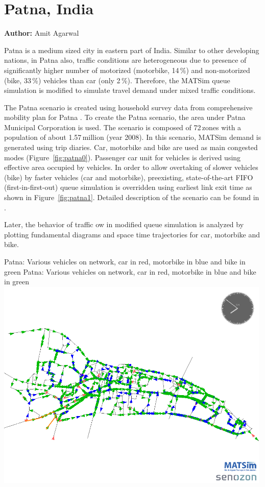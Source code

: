 \section{Patna, India}
\label{sec:patna}
\hfill \textbf{Author:} Amit Agarwal

Patna is a medium sized city in eastern part of India. Similar to other developing nations, in Patna also, traffic conditions are heterogeneous due to presence of significantly higher number of motorized (motorbike, 14\,\%) and non-motorized (bike, 33\,\%) vehicles than car (only 2\,\%). Therefore, the MATSim queue simulation is modified to simulate travel demand under mixed traffic conditions.

The Patna scenario is created using household survey data from comprehensive mobility plan for Patna \citep[][]{TrippItransVks2009PatnaReport}. To create the Patna scenario, the area under Patna Municipal Corporation is used. The scenario is composed of 72\,zones with a population of about 1.57\,million (year 2008). In this scenario, MATSim demand is generated using trip diaries. Car, motorbike and bike are used as main congested modes (Figure~\ref{fig:patna0}). Passenger car unit for vehicles is derived using effective area occupied by vehicles. In order to allow overtaking of slower vehicles (bike) by faster vehicles (car and motorbike), preexisting, state-of-the-art FIFO (first-in-first-out) queue simulation is overridden using earliest link exit time as shown in Figure~\ref{fig:patna1}. Detailed description of the scenario can be found in \citet[][]{AgarwalEtcMixedTraffic}.

Later, the behavior of traffic ow in modified queue simulation is analyzed by plotting fundamental diagrams and space time trajectories for car, motorbike and bike.

\createfigure%
{Patna: Various vehicles on network, car in red, motorbike in blue and bike in green}%
{Patna: Various vehicles on network, car in red, motorbike in blue and bike in green}%
{\label{fig:patna0}}%
{\includegraphics[width=0.99\textwidth, angle=0]{using/figures/vehiclesOnNetwork}}%
{}

